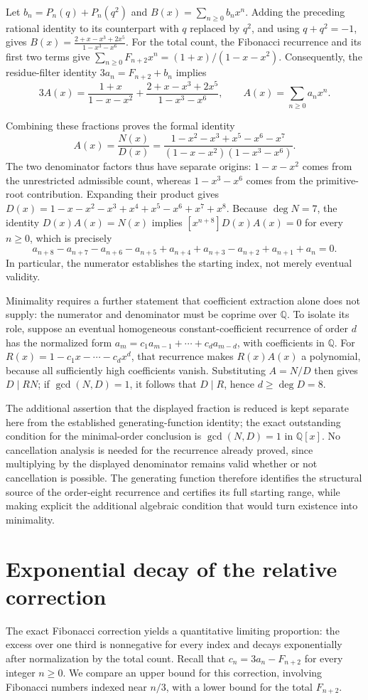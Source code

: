 \documentclass[11pt]{article}
\begin{document}
Let $b_n=P_n(q)+P_n(q^2)$ and $B(x)=\sum_{n\geq0}b_nx^n$. Adding the preceding rational identity to its counterpart with $q$ replaced by $q^2$, and using $q+q^2=-1$, gives
$B(x)=\frac{2+x-x^3+2x^5}{1-x^3-x^6}.$
For the total count, the Fibonacci recurrence and its first two terms give $\sum_{n\geq0}F_{n+2}x^n=(1+x)/(1-x-x^2)$. Consequently, the residue-filter identity $3a_n=F_{n+2}+b_n$ implies
\[3A(x)=\frac{1+x}{1-x-x^2}+\frac{2+x-x^3+2x^5}{1-x^3-x^6},\qquad A(x)=\sum_{n\geq0}a_nx^n.\]

Combining these fractions proves the formal identity
\[A(x)=\frac{N(x)}{D(x)}=\frac{1-x^2-x^3+x^5-x^6-x^7}{(1-x-x^2)(1-x^3-x^6)}.\]
The two denominator factors thus have separate origins: $1-x-x^2$ comes from the unrestricted admissible count, whereas $1-x^3-x^6$ comes from the primitive-root contribution. Expanding their product gives $D(x)=1-x-x^2-x^3+x^4+x^5-x^6+x^7+x^8$. Because $\deg N=7$, the identity $D(x)A(x)=N(x)$ implies $[x^{n+8}]D(x)A(x)=0$ for every $n\geq0$, which is precisely
\[a_{n+8}-a_{n+7}-a_{n+6}-a_{n+5}+a_{n+4}+a_{n+3}-a_{n+2}+a_{n+1}+a_n=0.\]
In particular, the numerator establishes the starting index, not merely eventual validity.

Minimality requires a further statement that coefficient extraction alone does not supply: the numerator and denominator must be coprime over $\mathbb{Q}$. To isolate its role, suppose an eventual homogeneous constant-coefficient recurrence of order $d$ has the normalized form $a_m=c_1a_{m-1}+\cdots+c_da_{m-d}$, with coefficients in $\mathbb{Q}$. For $R(x)=1-c_1x-\cdots-c_dx^d$, that recurrence makes $R(x)A(x)$ a polynomial, because all sufficiently high coefficients vanish. Substituting $A=N/D$ then gives $D\mid RN$; if $\gcd(N,D)=1$, it follows that $D\mid R$, hence $d\geq\deg D=8$.

The additional assertion that the displayed fraction is reduced is kept separate here from the established generating-function identity; the exact outstanding condition for the minimal-order conclusion is $\gcd(N,D)=1$ in $\mathbb{Q}[x]$. No cancellation analysis is needed for the recurrence already proved, since multiplying by the displayed denominator remains valid whether or not cancellation is possible. The generating function therefore identifies the structural source of the order-eight recurrence and certifies its full starting range, while making explicit the additional algebraic condition that would turn existence into minimality.

\section{Exponential decay of the relative correction}
The exact Fibonacci correction yields a quantitative limiting proportion: the excess over one third is nonnegative for every index and decays exponentially after normalization by the total count. Recall that $c_n=3a_n-F_{n+2}$ for every integer $n\geq 0$. We compare an upper bound for this correction, involving Fibonacci numbers indexed near $n/3$, with a lower bound for the total $F_{n+2}$.
\end{document}
